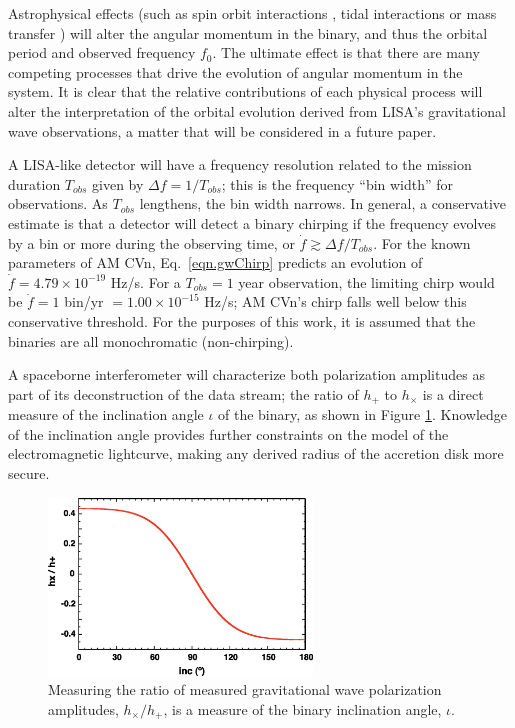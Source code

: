 \documentclass[preprint2]{aastex}
\begin{document}
Astrophysical effects (such as spin orbit interactions \citep{Hut1981},
tidal interactions \citep{wvk2008} or mass transfer
\citep{DeloyeTaam2006}) will alter the angular momentum in the binary,
and thus the orbital period and observed frequency $f_{0}$.  The
ultimate effect is that there are many competing processes that drive
the evolution of angular momentum in the system.  It is clear that the
relative contributions of each physical process will alter the
interpretation of the orbital evolution derived from LISA's
gravitational wave observations, a matter that will be considered in a
future paper.

A LISA-like detector will have a frequency resolution related to the
mission duration $T_{obs}$ given by $\Delta f = 1/T_{obs}$; this is
the frequency ``bin width'' for observations.  As $T_{obs}$ lengthens,
the bin width narrows.  In general, a conservative estimate is that a
detector will detect a binary chirping if the frequency evolves by a
bin or more during the observing time, or ${\dot f} \gtrsim \Delta
f/T_{obs}$.  For the known parameters of AM CVn, Eq.\
\ref{eqn.gwChirp} predicts an evolution of ${\dot f} = 4.79 \times
10^{-19}$ Hz/s.  For a $T_{obs} = 1$ year observation, the limiting
chirp would be ${\dot f} = 1$ bin/yr $= 1.00 \times 10^{-15}$ Hz/s; AM
CVn's chirp falls well below this conservative threshold.  For the
purposes of this work, it is assumed that the binaries are all
monochromatic (non-chirping).

A spaceborne interferometer will characterize both {polarization} amplitudes as part
of its deconstruction of the data stream; the ratio of $h_{+}$ to
$h_{\times}$ is a direct measure of the inclination angle $\iota$ of
the binary, as shown in Figure \ref{fig.inclination}.  Knowledge of
the inclination angle provides further constraints on the model of the
electromagnetic lightcurve, making any derived radius of the
accretion disk more secure.
        
\begin{figure}[t!]
  \centering
  \includegraphics[width=70mm]{./figs/gwInclination.eps} 
  \caption{{\small Measuring the ratio of measured gravitational wave 
  polarization amplitudes, $h_{\times}/h_{+}$, is a measure of 
  the binary inclination angle, $\iota$.}}
  \label{fig.inclination}
\end{figure}
\end{document}
